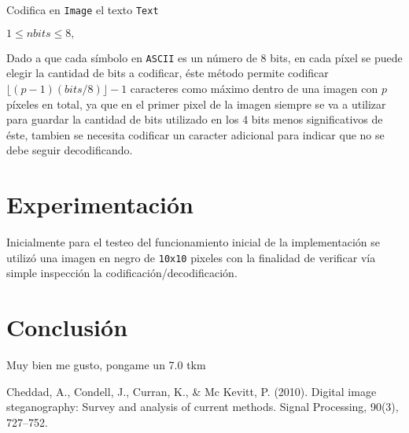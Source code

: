 \documentclass[conference]{IEEEtran}
\begin{document}
        \begin{algorithm}
        \caption{Codifica en \texttt{Image} el texto \texttt{Text}}
        \begin{algorithmic}
        \REQUIRE $ 1 \leq nbits \leq 8, $        
        
        \end{algorithmic}
        \end{algorithm}

    
        Dado a que cada símbolo en \texttt{ASCII} es un número de 8 bits, en cada píxel se puede elegir la cantidad de bits a codificar, éste método permite codificar $\lfloor(p-1)(bits / 8)\rfloor - 1$ caracteres como máximo dentro de una imagen con $p$ píxeles en total, ya que en el primer pixel de la imagen siempre se va a utilizar para guardar la cantidad de bits utilizado en los 4 bits menos significativos de éste, tambien se necesita codificar un caracter adicional para indicar que no se debe seguir decodificando.
        
        
\section*{Experimentación}
    Inicialmente para el testeo del funcionamiento inicial de la implementación se utilizó una imagen en negro de \texttt{10x10} pixeles con la finalidad de verificar vía simple inspección la codificación/decodificación.
    
    

\section*{Conclusión}
	Muy bien me gusto, pongame un 7.0 tkm


\begin{thebibliography}{99}
 Cheddad, A., Condell, J., Curran, K., \& Mc Kevitt, P. (2010). Digital image 
steganography: Survey and analysis of current methods. Signal Processing, 90(3), 727–752. 


\end{thebibliography}
\end{document}
